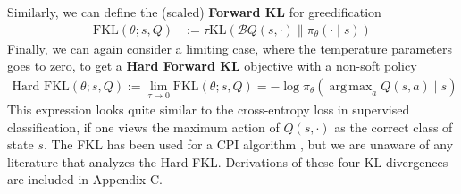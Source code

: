\documentclass{article}
\DeclareMathOperator*{\argmax}{arg\,max}
\newcommand{\R}{\mathbb{R}}
\newcommand{\statespace}{\mathcal{S}}
\newcommand{\actionspace}{\mathcal{A}}
\newcommand{\Qhat}{{Q}}
\newcommand{\KL}{\mathrm{KL}}
\newcommand{\policyparams}{\theta}
\newcommand{\boltzmannQ}{\mathcal{B}Q}
\newcommand{\entropy}{\mathcal{H}}
\newcommand{\defeq}{:=}
\begin{document}
Similarly, we can define the (scaled) \textbf{Forward KL} for greedification %
%
\begin{align}
\text{FKL}(\policyparams; s, \Qhat) &\defeq  %
    \tau\KL\left(\boltzmannQ(s, \cdot)  \parallel \pi_\policyparams(\cdot \mid s) \right)\nonumber%
\end{align}
%
%
%
Finally, we can again consider a limiting case, where the temperature parameters goes to zero, to get a \textbf{Hard Forward KL} objective with a non-soft policy
%
\begin{align}
  \text{Hard FKL}(\policyparams; s, \Qhat) \defeq  \lim_{\tau \to 0} \text{FKL}(\policyparams; s, \Qhat) = -\log \pi_\policyparams(\argmax_a Q(s, a) \mid s)
\end{align}
%
This expression looks quite similar to the cross-entropy loss in supervised classification, if one views the maximum action of $Q(s, \cdot)$ as the correct class of state $s$. The FKL has been used for a CPI algorithm \citep{vieillard2019deep}, but we are unaware of any literature that analyzes the Hard FKL. Derivations of these four KL divergences are included in Appendix C.
\end{document}
